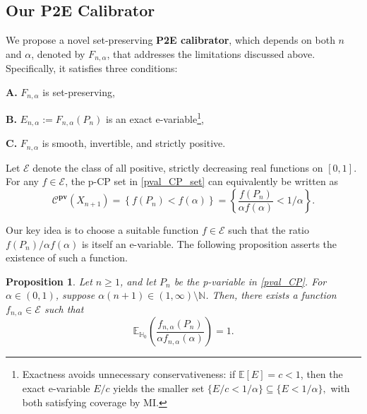 \documentclass{article}
\theoremstyle{plain}
\newtheorem{proposition}[theorem]{Proposition}
\theoremstyle{definition}
\theoremstyle{remark}
\begin{document}
\subsection{Our P2E Calibrator}


We propose a novel set-preserving \textbf{P2E calibrator}, which depends on both $n$ and $\alpha$, denoted by $F_{n,\alpha}$, that addresses the limitations discussed above. Specifically, it satisfies three conditions:

\textbf{A.} $F_{n,\alpha}$ is set-preserving,

\textbf{B.}  $E_{n,\alpha} := F_{n,\alpha}(P_n)$ is an exact e-variable\footnote{Exactness avoids unnecessary conservativeness: if \(\mathbb{E}[E]=c<1\), then the exact e-variable \(E/c\) yields the smaller set $\{E/c<1/\alpha\}\subseteq\{E<1/\alpha\},$ with both  satisfying coverage by MI.},

\textbf{C.} $F_{n,\alpha}$ is smooth, invertible, and strictly positive. 















Let $\mathcal{E}$ denote the class of all positive, strictly decreasing real functions on $[0,1]$. For any $f \in \mathcal{E}$, the p-CP set in \eqref{pval_CP_set} can equivalently be written as
\begin{equation}
\label{equality_setsCP}
   \mathcal{C}^{\textbf{pv}}(X_{n+1}) 
   =  \left\{ f(P_n)<f(\alpha) \right\}=\left\{ \frac{f(P_n)}{\alpha f(\alpha)} < 1/\alpha \right\}. 
\end{equation}

Our key idea is to choose a suitable function $f \in \mathcal{E}$ such that the ratio $f(P_n)/\alpha f(\alpha)$ is itself an e-variable.  The following proposition asserts the existence of such a function.  

\begin{proposition}
\label{prop:fnalpha}
Let $n \geq 1$, and let $P_n$ be the p-variable in \eqref{pval_CP}. For $\alpha \in (0,1)$, suppose $\alpha(n+1) \in (1,\infty) \setminus \mathbb{N}$. Then, there exists a function $f_{n,\alpha} \in \mathcal{E}$ such that
\begin{equation}
\label{E(F)=1}
    \mathbb{E}_{\mathbb{H}_0}\!\left(\frac{f_{n,\alpha}(P_n)}{\alpha f_{n,\alpha}(\alpha)}\right) = 1.
\end{equation}

\end{proposition}
\end{document}
